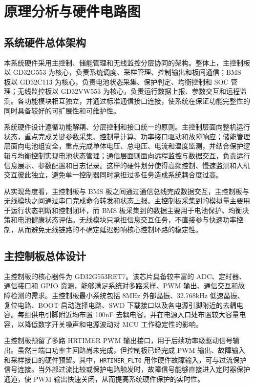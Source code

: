\section{原理分析与硬件电路图}

\subsection{系统硬件总体架构}

本系统硬件采用主控制、储能管理和无线监控分层协同的架构。整体上，主控制板以 GD32G553 为核心，负责系统调度、采样管理、控制输出和板间通信；BMS 板以 GD32C113 为核心，负责电池状态采集、保护判定、均衡控制和 SOC 管理；无线监控板以 GD32VW553 为核心，负责运行数据上报、参数交互和远程监测。各功能模块相互独立，并通过标准通信接口连接，使系统在保证功能完整性的同时具备较好的可扩展性和可维护性。

系统硬件设计遵循功能解耦、分层控制和接口统一的原则。主控制层面向整机运行状态，重点完成关键参数采集、控制量计算、功率接口驱动和故障响应；储能管理层面向电池组安全，重点完成单体电压、总电压、电流和温度监测，并结合保护逻辑与均衡控制实现电池状态管理；通信层面则面向远程监控与数据交互，负责运行信息展示、参数配置和日志记录。这样的硬件划分使得高频控制、慢速监测和人机交互彼此独立，避免单一控制器同时承担过多任务造成系统耦合度过高。

从实现角度看，主控制板与 BMS 板之间通过通信总线完成数据交互，主控制板与无线模块之间通过串口完成命令转发和状态上报。主控制板采集到的模拟量主要用于运行状态判断和控制闭环，而 BMS 板采集到的数据主要用于电池保护、均衡决策和电池健康状态评估。无线模块只承担信息交互任务，不直接参与快速功率控制，从而避免无线链路的不确定延迟影响核心控制环路的稳定性。

\subsection{主控制板总体设计}

主控制板的核心器件为 GD32G553RET7。该芯片具备较丰富的 ADC、定时器、通信接口和 GPIO 资源，能够满足系统对多路采样、PWM 输出、通信交互和故障检测的需求。主控制板最小系统包括 8MHz 外部晶振、32.768kHz 低速晶振、复位电路、BOOT 启动选择电路、SWD 下载接口以及各电源引脚附近的去耦电容。每组供电引脚附近均布置 100nF 去耦电容，并在电源入口处布置较大容量电容，以降低数字开关噪声和电源波动对 MCU 工作稳定性的影响。

主控制板预留了多路 HRTIMER PWM 输出接口，用于后续功率级驱动信号输出。虽然三端口功率主回路尚未完成，但控制板已经完成 PWM 输出、故障输入和采样接口的硬件预留。其中，\texttt{HRTIMER\_FLT0} 用作硬件故障输入，可与过流保护信号连接。当外部过流比较或保护电路触发时，故障信号能够直接进入定时器保护通道，使 PWM 输出快速关闭，从而提高系统硬件保护的实时性。

